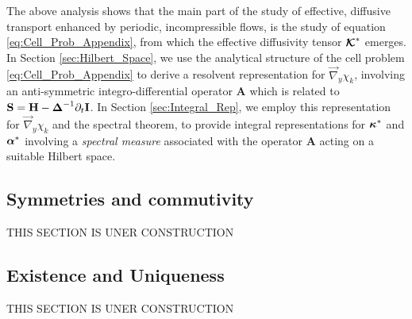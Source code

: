 \documentclass[11pt]{amsart}
\newcommand{\Hb}{\mathbf{H}}
\newcommand{\Ib}{\mathbf{I}}
\newcommand{\Sb}{\mathbf{S}}
\newcommand{\Ab}{\mathbf{A}}
\newcommand\Kbc{\mbox{\boldmath${\mathcal{K}}$}}
\newcommand\balpha{\mbox{\boldmath${\alpha}$}}
\newcommand\bDelta{\mbox{\boldmath${\Delta}$}}
\newcommand\bkappa{\mbox{\boldmath${\kappa}$}}
\begin{document}
The above analysis shows that the main part of the study of effective, 
diffusive transport enhanced by periodic, incompressible flows, is the
study of equation \eqref{eq:Cell_Prob_Appendix}, from which the
effective diffusivity tensor $\Kbc^*$ emerges. In Section
\ref{sec:Hilbert_Space}, we use the analytical structure of the cell
problem \eqref{eq:Cell_Prob_Appendix} to derive a resolvent
representation for $\vec{\nabla}_y\chi_k$, involving an anti-symmetric
integro-differential operator $\Ab$ which is related to 
$\Sb=\Hb-\bDelta^{-1}\partial_t\Ib$. In Section \ref{sec:Integral_Rep}, 
we employ this representation for $\vec{\nabla}_y\chi_k$ and the spectral
theorem, to provide integral representations for $\bkappa^*$ and
$\balpha^*$ involving a \emph{spectral measure} associated with the
operator $\Ab$ acting on a suitable Hilbert space.     
   

\subsection{Symmetries and commutivity}\label{sec:Symmetries_Commute}
%
THIS SECTION IS UNER CONSTRUCTION

%
\subsection{Existence and Uniqueness}\label{sec:Existance!}
%
THIS SECTION IS UNER CONSTRUCTION
\end{document}
